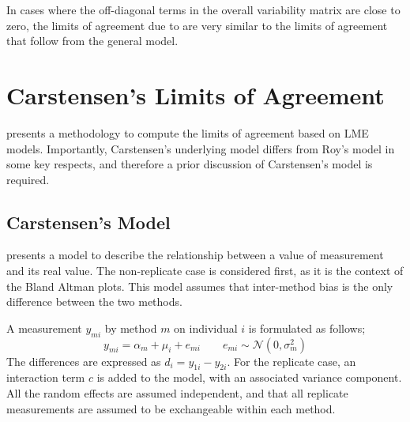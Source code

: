 \documentclass[12pt, a4paper]{report}
\theoremstyle{plain}
\theoremstyle{definition}
\theoremstyle{remark}
\begin{document}
In cases where the off-diagonal terms in the overall variability
matrix are close to zero, the limits of agreement due to
\citet{bxc2008} are very similar to the limits of agreement that
follow from the general model.

\newpage

%



\newpage
	\section{Carstensen's Limits of Agreement}
	\citet{bxc2008} presents a methodology to compute the limits of
	agreement based on LME models. Importantly, Carstensen's underlying model differs from Roy's model in some key respects, and therefore a prior discussion of Carstensen's model is required.
	
	\subsection{Carstensen's Model}
	
	\citet{BXC2004} presents a model to describe the relationship between a value of measurement and its
	real value. The non-replicate case is considered first, as it is the context of the Bland Altman plots. This model assumes that inter-method bias is the only difference between the two methods.
	
	A measurement $y_{mi}$ by method $m$ on individual $i$ is formulated as follows;
	\begin{equation}
	y_{mi}  = \alpha_{m} + \mu_{i} + e_{mi} \qquad  e_{mi} \sim
	\mathcal{N}(0,\sigma^{2}_{m})
	\end{equation}
	The differences are expressed as $d_{i} = y_{1i} - y_{2i}$. For the replicate case, an interaction term $c$ is added to the model, with an associated variance component. All the random effects are assumed independent, and that all replicate measurements are assumed to be exchangeable within each method.
	
\end{document}
